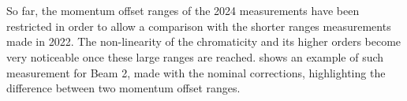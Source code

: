 \section{}

\subsection{}

So far, the momentum offset ranges of the 2024 measurements have been restricted in order to allow a 
comparison with the shorter ranges measurements made in 2022. The non-linearity of the chromaticity 
and its higher orders become very noticeable once these large ranges are reached.
 shows an example of such measurement for 
Beam 2, made with the nominal corrections, highlighting the difference between two momentum offset
ranges.

